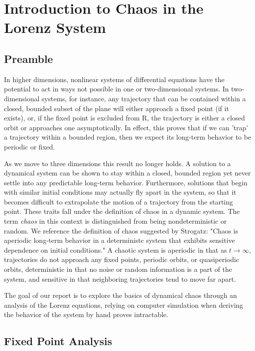 \documentclass{report}
\begin{document}
\chapter{Introduction to Chaos in the Lorenz System}
\section{Preamble}
In higher dimensions, nonlinear systems of differential equations have the
potential to act in ways not possible in one or two-dimensional systems. In 
two-dimensional systems, for instance, any trajectory that can be contained within a closed, bounded subset of the plane will either approach a fixed point
(if it exists), or, if the fixed point is excluded from R, the trajectory is
either a closed orbit or approaches one asymptotically. In effect, this proves
that if we can 'trap' a trajectory within a bounded region, then we expect its 
long-term behavior to be periodic or fixed.
	
As we move to three dimensions this result no longer holds. A solution to a
dynamical system can be shown to stay within a closed, bounded region yet
never settle into any predictable long-term behavior. Furthermore, solutions 
that begin with similar initial conditions may actually fly apart in the 
system, so that it becomes difficult to extrapolate the motion of a trajectory 
from the starting point. These traits fall under the definition of chaos in a
dynamic system. The term \emph{chaos} in this context is distinguished from
being nondeterministic or random. We reference the definition of chaos
suggested by Strogatz\cite{strogatz15}: "Chaos is aperiodic long-term behavior
in a deterministc system that exhibits sensitive dependence on initial
conditions." A chaotic system is aperiodic in that as \(t \rightarrow \infty\),
trajectories do not approach any fixed points, periodic orbits, or quasiperiodic
orbits, deterministic in that no noise or random information is a part of the
system, and sensitive in that neighboring trajectories tend to move far apart.

The goal of our report is to explore the basics of dynamical 
chaos through an analysis of the Lorenz equations, relying on computer
simulation when deriving the behavior of the system by hand proves intractable.

\section{Fixed Point Analysis}
\end{document}
